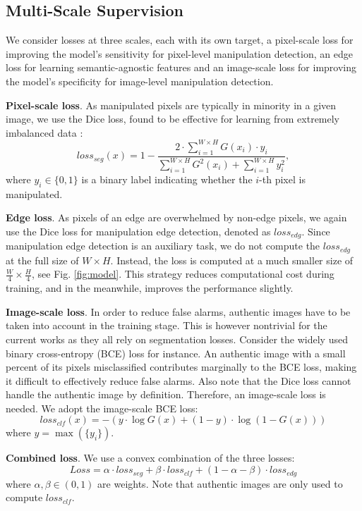 \subsection{Multi-Scale Supervision} \label{ssec:loss} 

We consider losses at three scales, each with its own target, \ie a pixel-scale loss for improving the model's sensitivity for pixel-level manipulation detection, an edge loss for learning semantic-agnostic features and an image-scale loss for improving the model's specificity for image-level manipulation detection. 

\textbf{Pixel-scale loss}. As manipulated pixels are typically in minority in a given image, we use the Dice loss, found to be effective for learning from extremely imbalanced data \cite{lesion}:
\begin{equation} 
loss_{seg}(x) = 1 - \frac{2 \cdot \sum\nolimits_{i = 1}^{W \times H} G(x_i) \cdot y_i}{\sum\nolimits_{i = 1}^{W \times H} G^2(x_i)  + \sum\nolimits_{i = 1}^{W \times H} y^2_i},
\label{eq:dice}
\end{equation}
where $y_i\in\{0,1\}$ is a binary label indicating whether the $i$-th pixel is manipulated. 







\textbf{Edge loss}. As pixels of an edge are overwhelmed by non-edge pixels, we again use the Dice loss for manipulation edge detection, denoted as $loss_{edg}$. Since manipulation edge detection is an auxiliary task, we do not compute the $loss_{edg}$ at the full size of $W \times H$. Instead, the loss is computed at a much smaller size of $\frac{W}{4} \times \frac{H}{4}$, see Fig. \ref{fig:model}. This strategy reduces computational cost during training, and in the meanwhile, improves the performance slightly. 


\textbf{Image-scale loss}. In order to reduce false alarms, authentic images have to be taken into account in the training stage. This is however nontrivial for the current works \cite{mantranet,HPFCN,2020GSR,2017MFCN} as they all rely on segmentation losses. Consider the widely used binary cross-entropy (BCE) loss for instance. An authentic image with a small percent of its pixels misclassified contributes marginally to the BCE loss, making it difficult to effectively reduce false alarms. Also note that the Dice loss cannot handle the authentic image by definition. Therefore, an image-scale loss is needed. 
We adopt the image-scale BCE loss:
\begin{equation} \label{eq:loss-clf}
loss_{clf}(x) = - ( y \cdot \log G(x)  + (1 - y) \cdot \log(1 - G(x)) )
\end{equation}
where $y=\max(\{y_i\})$.

\textbf{Combined loss}. We use a convex combination of the three losses:
\begin{equation}
    Loss = \alpha \cdot loss_{seg} + \beta \cdot loss_{clf} + (1 - \alpha - \beta) \cdot loss_{edg}
\end{equation} 
where $\alpha, \beta \in(0,1)$ are weights. Note that authentic images are only used to compute $loss_{clf}$.
